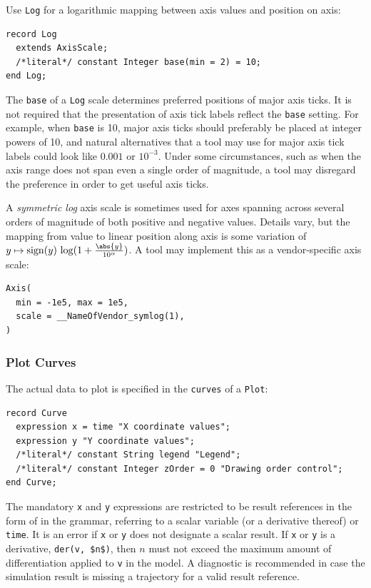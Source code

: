 Use \lstinline!Log! for a logarithmic mapping between axis values and position on axis:
\begin{lstlisting}[language=modelica]
record Log
  extends AxisScale;
  /*literal*/ constant Integer base(min = 2) = 10;
end Log;
\end{lstlisting}%

The \lstinline!base! of a \lstinline!Log! scale determines preferred positions of major axis ticks.
It is not required that the presentation of axis tick labels reflect the \lstinline!base! setting.
For example, when \lstinline!base! is 10, major axis ticks should preferably be placed at integer powers of 10, and natural alternatives that a tool may use for major axis tick labels could look like $0.001$ or $10^{-3}$.
Under some circumstances, such as when the axis range does not span even a single order of magnitude, a tool may disregard the preference in order to get useful axis ticks.

\begin{example}
A \emph{symmetric log} axis scale is sometimes used for axes spanning across several orders of magnitude of both positive and negative values.
Details vary, but the mapping from value to linear position along axis is some variation of $y \mapsto \operatorname{sign}(y)\, \operatorname{log}(1 + \frac{\abs{y}}{10^{\alpha}})$.
A tool may implement this as a vendor-specific axis scale:
\begin{lstlisting}[language=modelica]
Axis(
  min = -1e5, max = 1e5,
  scale = __NameOfVendor_symlog(1),
)
\end{lstlisting}
\end{example}

\subsubsection{Plot Curves}\label{plot-curves}

The actual data to plot is specified in the \lstinline!curves! of a \lstinline!Plot!:
\begin{lstlisting}[language=modelica]
record Curve
  expression x = time "X coordinate values";
  expression y "Y coordinate values";
  /*literal*/ constant String legend "Legend";
  /*literal*/ constant Integer zOrder = 0 "Drawing order control";
end Curve;
\end{lstlisting}

The mandatory \lstinline!x! and \lstinline!y! expressions are restricted to be result references in the form of  in the grammar, referring to a scalar variable (or a derivative thereof) or \lstinline!time!.
It is an error if \lstinline!x! or \lstinline!y! does not designate a scalar result.
If \lstinline!x! or \lstinline!y! is a derivative, \lstinline!der(v, $n$)!, then $n$ must not exceed the maximum amount of differentiation applied to \lstinline!v! in the model.
A diagnostic is recommended in case the simulation result is missing a trajectory for a valid result reference.

